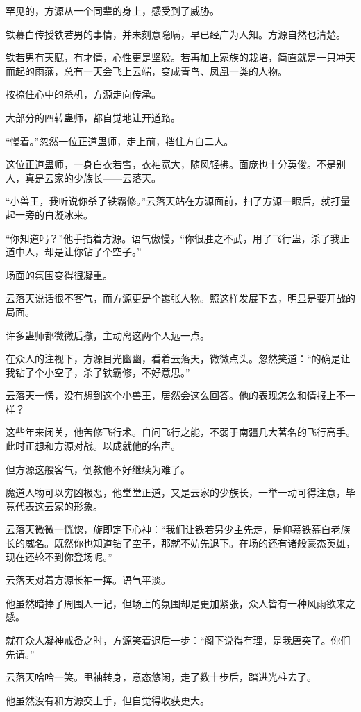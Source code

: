 \begin{this_body}
罕见的，方源从一个同辈的身上，感受到了威胁。

铁慕白传授铁若男的事情，并未刻意隐瞒，早已经广为人知。方源自然也清楚。

铁若男有天赋，有才情，心性更是坚毅。若再加上家族的栽培，简直就是一只冲天而起的雨燕，总有一天会飞上云端，变成青鸟、凤凰一类的人物。

按捺住心中的杀机，方源走向传承。

大部分的四转蛊师，都自觉地让开道路。

“慢着。”忽然一位正道蛊师，走上前，挡住方白二人。

这位正道蛊师，一身白衣若雪，衣袖宽大，随风轻拂。面庞也十分英俊。不是别人，真是云家的少族长——云落天。

“小兽王，我听说你杀了铁霸修。”云落天站在方源面前，扫了方源一眼后，就打量起一旁的白凝冰来。

“你知道吗？”他手指着方源。语气傲慢，“你很胜之不武，用了飞行蛊，杀了我正道中人，却是让你钻了个空子。”

场面的氛围变得很凝重。

云落天说话很不客气，而方源更是个嚣张人物。照这样发展下去，明显是要开战的局面。

许多蛊师都微微后撤，主动离这两个人远一点。

在众人的注视下，方源目光幽幽，看着云落天，微微点头。忽然笑道：“的确是让我钻了个小空子，杀了铁霸修，不好意思。”

云落天一愣，没有想到这个小兽王，居然会这么回答。他的表现怎么和情报上不一样？

这些年来闭关，他苦修飞行术。自问飞行之能，不弱于南疆几大著名的飞行高手。此时正想和方源对战。以成就他的名声。

但方源这般客气，倒教他不好继续为难了。

魔道人物可以穷凶极恶，他堂堂正道，又是云家的少族长，一举一动可得注意，毕竟代表这云家的形象。

云落天微微一恍惚，旋即定下心神：“我们让铁若男少主先走，是仰慕铁慕白老族长的威名。既然你也知道钻了空子，那就不妨先退下。在场的还有诸般豪杰英雄，现在还轮不到你登场呢。”

云落天对着方源长袖一挥。语气平淡。

他虽然暗捧了周围人一记，但场上的氛围却是更加紧张，众人皆有一种风雨欲来之感。

就在众人凝神戒备之时，方源笑着退后一步：“阁下说得有理，是我唐突了。你们先请。”

云落天哈哈一笑。甩袖转身，意态悠闲，走了数十步后，踏进光柱去了。

他虽然没有和方源交上手，但自觉得收获更大。


\end{this_body}
